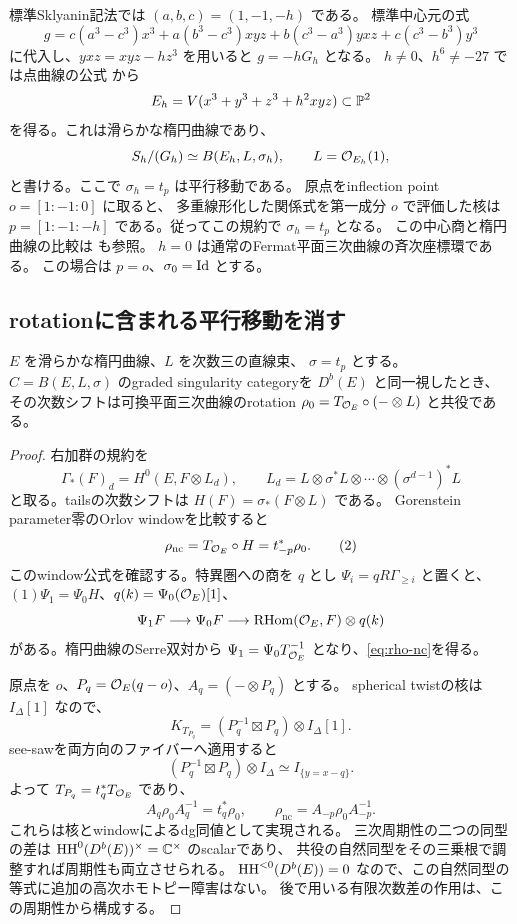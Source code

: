 標準Sklyanin記法では \((a,b,c)=(1,-1,-h)\) である。
標準中心元の式 \cite[Equation (2.16)]{Walton}
\[
 g=c(a^3-c^3)x^3+a(b^3-c^3)xyz+b(c^3-a^3)yxz+c(c^3-b^3)y^3
\]
に代入し、\(yxz=xyz-hz^3\) を用いると \(g=-hG_h\) となる。
\(h\ne0\)、\(h^6\ne-27\) では点曲線の公式
\cite[Theorem 2.14]{Walton}から
\[
 E_h=V(x^3+y^3+z^3+h^2xyz)\subset\mathbb P^2
\]
を得る。これは滑らかな楕円曲線であり、
\[
 S_h/(G_h)\simeq B(E_h,L,\sigma_h),\qquad L=\mathcal O_{E_h}(1),
\]
と書ける。ここで \(\sigma_h=t_p\) は平行移動である。
原点をinflection point \(o=[1:-1:0]\) に取ると、
多重線形化した関係式を第一成分 \(o\) で評価した核は
\(p=[1:-1:-h]\) である。従ってこの規約で \(\sigma_h=t_p\) となる。
この中心商と楕円曲線の比較は \cite[Sections 3.5--3.6]{EG} も参照。
\(h=0\) は通常のFermat平面三次曲線の斉次座標環である。
この場合は \(p=o\)、\(\sigma_0=\operatorname{Id}\) とする。

\subsection{rotationに含まれる平行移動を消す}

\begin{lemma}\label{lem:elliptic-conjugacy}
 \(E\) を滑らかな楕円曲線、\(L\) を次数三の直線束、
 \(\sigma=t_p\) とする。
 \(C=B(E,L,\sigma)\) のgraded singularity categoryを \(D^b(E)\) と同一視したとき、
 その次数シフトは可換平面三次曲線のrotation
 \(\rho_0=T_{\mathcal O_E}\circ(-\otimes L)\) と共役である。
\end{lemma}
\begin{proof}
 右加群の規約を
 \[
 \Gamma_*(F)_d=H^0(E,F\otimes L_d),\qquad
 L_d=L\otimes\sigma^*L\otimes\cdots\otimes(\sigma^{d-1})^*L
 \]
 と取る。tailsの次数シフトは \(H(F)=\sigma_*(F\otimes L)\) である。
 Gorenstein parameter零のOrlov windowを比較すると
 \[
 \rho_{\mathrm{nc}}=T_{\mathcal O_E}\circ H=t_{-p}^*\rho_0.
 \tag{2}\label{eq:rho-nc}
 \]
 このwindow公式を確認する。特異圏への商を \(q\) とし
 \(\Psi_i=qR\Gamma_{\ge i}\) と置くと、
 \((1)\Psi_1=\Psi_0H\)、\(q(k)=\Psi_0(\mathcal O_E)[1]\)、
 \[
 \Psi_1F\longrightarrow\Psi_0F
 \longrightarrow\operatorname{RHom}(\mathcal O_E,F)\otimes q(k)
 \]
 がある。楕円曲線のSerre双対から
 \(\Psi_1=\Psi_0T_{\mathcal O_E}^{-1}\) となり、\eqref{eq:rho-nc}を得る。

 原点を \(o\)、\(P_q=\mathcal O_E(q-o)\)、\(A_q=(-\otimes P_q)\) とする。
 spherical twistの核は \(I_\Delta[1]\) なので、
 \[
 K_{T_{P_q}}=(P_q^{-1}\boxtimes P_q)\otimes I_\Delta[1].
 \]
 see-sawを両方向のファイバーへ適用すると
 \[
 (P_q^{-1}\boxtimes P_q)\otimes I_\Delta
 \simeq I_{\{y=x-q\}}.
 \]
 よって \(T_{P_q}=t_q^*T_{\mathcal O_E}\) であり、
 \[
 A_q\rho_0A_q^{-1}=t_q^*\rho_0,\qquad
 \rho_{\mathrm{nc}}=A_{-p}\rho_0A_{-p}^{-1}.
 \tag{3}\label{eq:conjugacy}
 \]
 これらは核とwindowによるdg同値として実現される。
 三次周期性の二つの同型の差は \(\operatorname{HH}^0(D^b(E))^\times=\mathbb C^\times\) のscalarであり、
 共役の自然同型をその三乗根で調整すれば周期性も両立させられる。
 \(\operatorname{HH}^{<0}(D^b(E))=0\) なので、この自然同型の等式に追加の高次ホモトピー障害はない。
 後で用いる有限次数差の作用は、この周期性から構成する。
\end{proof}

